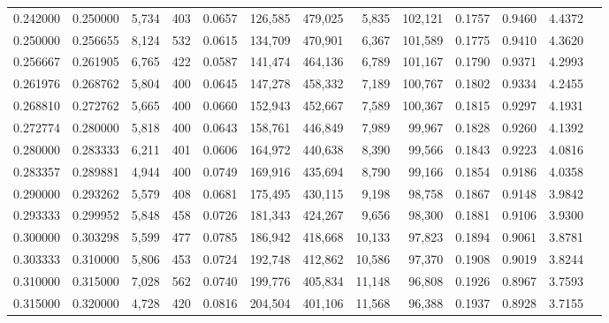 \begin{tabular}{rrrrrrrrrrrrr}
0.242000 & 0.250000 &  5,734 &   403 &                                     0.0657 & 126,585 & 479,025 &   5,835 & 102,121 & 0.1757 & 0.9460 & 4.4372 \\
0.250000 & 0.256655 &  8,124 &   532 &                                     0.0615 & 134,709 & 470,901 &   6,367 & 101,589 & 0.1775 & 0.9410 & 4.3620 \\
0.256667 & 0.261905 &  6,765 &   422 &                                     0.0587 & 141,474 & 464,136 &   6,789 & 101,167 & 0.1790 & 0.9371 & 4.2993 \\
0.261976 & 0.268762 &  5,804 &   400 &                                     0.0645 & 147,278 & 458,332 &   7,189 & 100,767 & 0.1802 & 0.9334 & 4.2455 \\
0.268810 & 0.272762 &  5,665 &   400 &                                     0.0660 & 152,943 & 452,667 &   7,589 & 100,367 & 0.1815 & 0.9297 & 4.1931 \\
0.272774 & 0.280000 &  5,818 &   400 &                                     0.0643 & 158,761 & 446,849 &   7,989 &  99,967 & 0.1828 & 0.9260 & 4.1392 \\
0.280000 & 0.283333 &  6,211 &   401 &                                     0.0606 & 164,972 & 440,638 &   8,390 &  99,566 & 0.1843 & 0.9223 & 4.0816 \\
0.283357 & 0.289881 &  4,944 &   400 &                                     0.0749 & 169,916 & 435,694 &   8,790 &  99,166 & 0.1854 & 0.9186 & 4.0358 \\
0.290000 & 0.293262 &  5,579 &   408 &                                     0.0681 & 175,495 & 430,115 &   9,198 &  98,758 & 0.1867 & 0.9148 & 3.9842 \\
0.293333 & 0.299952 &  5,848 &   458 &                                     0.0726 & 181,343 & 424,267 &   9,656 &  98,300 & 0.1881 & 0.9106 & 3.9300 \\
0.300000 & 0.303298 &  5,599 &   477 &                                     0.0785 & 186,942 & 418,668 &  10,133 &  97,823 & 0.1894 & 0.9061 & 3.8781 \\
0.303333 & 0.310000 &  5,806 &   453 &                                     0.0724 & 192,748 & 412,862 &  10,586 &  97,370 & 0.1908 & 0.9019 & 3.8244 \\
0.310000 & 0.315000 &  7,028 &   562 &                                     0.0740 & 199,776 & 405,834 &  11,148 &  96,808 & 0.1926 & 0.8967 & 3.7593 \\
0.315000 & 0.320000 &  4,728 &   420 &                                     0.0816 & 204,504 & 401,106 &  11,568 &  96,388 & 0.1937 & 0.8928 & 3.7155 \\

\end{tabular}
